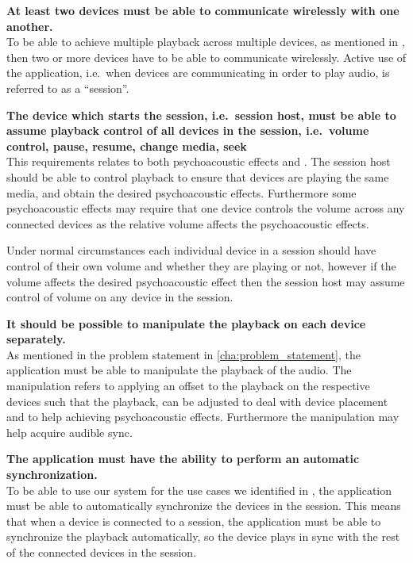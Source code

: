 \begin{eletterate}
    \item\label{req:wireless} \textbf{At least two devices must be able to communicate wirelessly with one another.} \hfill\\
        To be able to achieve multiple playback across multiple devices, as mentioned in ,
        then two or more devices have to be able to communicate wirelessly.
        Active use of the application, i.e.~when devices are communicating in order to play audio, is referred to as a ``session''.

    \item\label{req:host_control} \textbf{The device which starts the session, i.e.~session host, must be able to assume playback control of all devices in the session, i.e.~volume control, pause, resume, change media, seek} \hfill\\
        This requirements relates to both psychoacoustic effects and .
        The session host should be able to control playback to ensure that devices are playing the same media, and obtain the desired psychoacoustic effects.
        Furthermore some psychoacoustic effects may require that one device controls the volume across any connected devices as the relative volume affects the psychoacoustic effects.

        Under normal circumstances each individual device in a session should have control of their own volume and whether they are playing or not, however if the volume affects the desired psychoacoustic effect then the session host may assume control of volume on any device in the session.

    \item\label{req:manipulate} \textbf{It should be possible to manipulate the playback on each device separately.} \hfill\\
        As mentioned in the problem statement in \cref{cha:problem_statement}, the application must be able to manipulate the playback of the audio.
        The manipulation refers to applying an offset to the playback on the respective devices such that the playback, can be adjusted to deal with device placement and to help achieving psychoacoustic effects.
        Furthermore the manipulation may help acquire audible sync.

    \item\label{req:sync} \textbf{The application must have the ability to perform an automatic synchronization.} \hfill\\
        To be able to use our system for the use cases we identified in ,
        the application must be able to automatically synchronize the devices in the session.
        This means that when a device is connected to a session, the application must be able to synchronize the playback automatically,
        so the device plays in sync with the rest of the connected devices in the session.


\end{eletterate}
